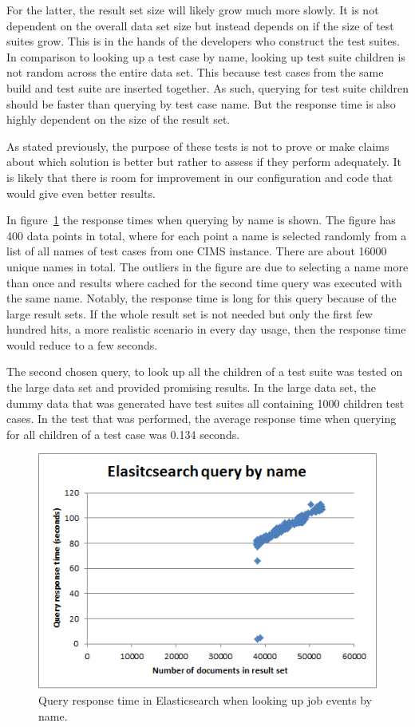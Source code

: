 For the latter, the result set size will likely grow much more slowly. It is not dependent on the overall data set size but instead depends on if the size of test suites grow. This is in the hands of the developers who construct the test suites. In comparison to looking up a test case by name, looking up test suite children is not random across the entire data set. This because test cases from the same build and test suite are inserted together. As such, querying for test suite children should be faster than querying by test case name. But the response time is also highly dependent on the size of the result set.

As stated previously, the purpose of these tests is not to prove or make claims about which solution is better but rather to assess if they perform adequately. It is likely that there is room for improvement in our configuration and code that would give even better results. 

In figure~\ref{fig:query_by_name} the response times when querying by name is shown. The figure has 400 data points in total, where for each point a name is selected randomly from a list of all names of test cases from one CIMS instance. There are about 16000 unique names in total. The outliers in the figure are due to selecting a name more than once and results where cached for the second time query was executed with the same name. Notably, the response time is long for this query because of the large result sets. If the whole result set is not needed but only the first few hundred hits, a more realistic scenario in every day usage, then the response time would reduce to a few seconds.

The second chosen query, to look up all the children of a test suite was tested on the large data set and provided promising results. In the large data set, the dummy data that was generated have test suites all containing 1000 children test cases. In the test that was performed, the average response time when querying for all children of a test case was 0.134 seconds.

\begin{figure}[h!]
\centering
\includegraphics[]{figure/es_by_name.png}
\caption{Query response time in Elasticsearch when looking up job events by name.}
\label{fig:query_by_name}
\end{figure}

